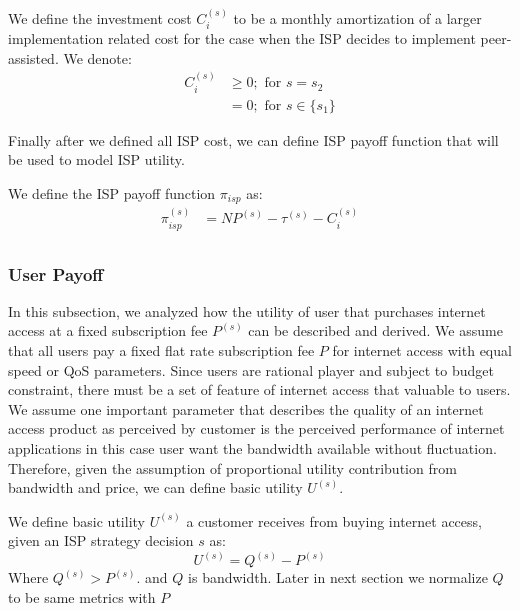 \documentclass[paper]{ieice}
\begin{document}
\newtheorem{theorem4}{Definition}
\begin{theorem}
We define the investment cost $C^{(s)}_i$ to be a monthly amortization of a larger implementation related cost for the case when the ISP decides to implement peer-assisted. 
We denote:
\begin{align}
	C^{(s)}_i &\ge 0; \text{ for } s = s_2 \\
	          &= 0; \text{ for } s \in \{s_1\}
\end{align}
\end{theorem}

Finally after we defined all ISP cost, we can define ISP payoff function that will be used to model ISP utility.  

\newtheorem{theorem5}{Definition}
\begin{theorem}
We define the ISP payoff function $\pi_{isp}$ as:
\begin{align}\label{eq:isppayoff}
	\pi_{isp}^{(s)} &= N P^{(s)} - \tau^{(s)} - C_i^{(s)} \\
\end{align}
\end{theorem}

\subsubsection{User Payoff}
In this subsection, we  analyzed how the utility of user that purchases internet access at a fixed subscription fee $P^{(s)}$ can be described and derived. 
We assume that all users pay a fixed flat rate subscription fee $P$ for internet access with equal speed or QoS parameters.
Since users are rational player and subject to budget constraint, there must be a set of feature of internet access that valuable to users.
We assume one important parameter that describes the quality of an internet access product as perceived by customer is the perceived performance of internet applications in this case user want the bandwidth available without fluctuation.  
Therefore, given the assumption of proportional utility contribution from bandwidth and price, we can define basic utility $U^{(s)}$. 

\newtheorem{theorem6}{Definition}
\begin{theorem}
We define basic utility $U^{(s)}$ a customer receives from buying internet access, given an ISP strategy decision $s$ as:
\begin{equation}
	U^{(s)} = Q^{(s)} - P^{(s)}
\end{equation}
Where $Q^{(s)} > P^{(s)}$. and $Q$ is bandwidth. Later in next section we normalize $Q$ to be same metrics with $P$
\end{theorem}
\end{document}
